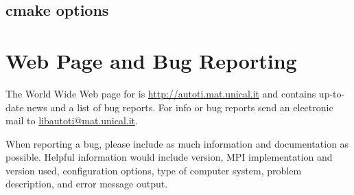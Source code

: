 \subsection{cmake options}




\section{Web Page and Bug Reporting}

The World Wide Web page for \texttt{\ocal} is
\url{http://autoti.mat.unical.it} and contains up-to-date news and
a list of bug reports. For info or bug reports send an electronic
mail to
\href{mailto:libautoti@mat.unical.it}{libautoti@mat.unical.it}.

When reporting a bug, please include as much information and
documentation as possible. Helpful information would include
\texttt{\ocal} version, MPI implementation and version used,
configuration options, type of computer system, problem
description, and error message output.
